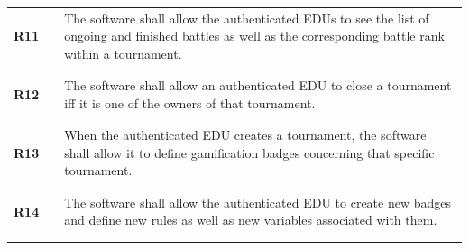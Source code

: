 \begin{longtable}[H]{l l p{12cm}}
    \textbf{R11} & \vline & The software shall allow the authenticated EDUs to see the list of ongoing and finished battles as well as the corresponding battle rank within a tournament.                                                                                                            \\
                 &        &                                                                                                                                                                                                                                                                          \\\hline & & \\
    \textbf{R12} & \vline & The software shall allow an authenticated EDU to close a tournament iff it is one of the owners of that tournament.                                                                                                                                                      \\
                 &        &                                                                                                                                                                                                                                                                          \\\hline & & \\
    \textbf{R13} & \vline & When the authenticated EDU creates a tournament, the software shall allow it to define gamification badges concerning that specific tournament.                                                                                                                          \\
                 &        &                                                                                                                                                                                                                                                                          \\\hline & & \\
    \textbf{R14} & \vline & The software shall allow the authenticated EDU to create new badges and define new rules as well as new variables associated with them.                                                                                                                                  \\
                 &        &                                                                                                                                                                                                                                                                          \\\hline & & \\

\end{longtable}
